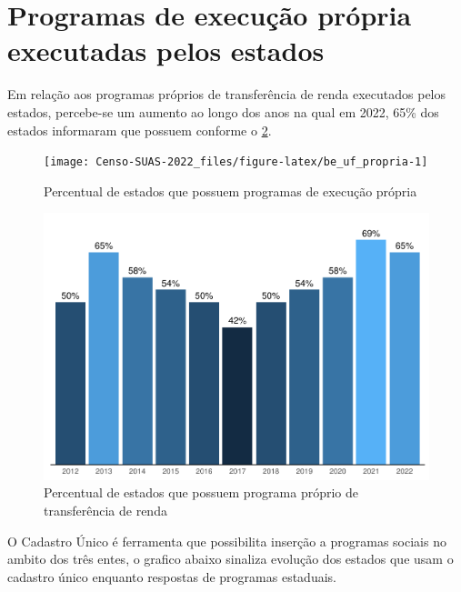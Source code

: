 \documentclass[
  brazilian]{report}
\begin{document}
\hypertarget{programas-de-execuuxe7uxe3o-pruxf3pria-executadas-pelos-estados}{%
\section{Programas de execução própria executadas pelos
estados}\label{programas-de-execuuxe7uxe3o-pruxf3pria-executadas-pelos-estados}}

Em relação aos programas próprios de transferência de renda executados
pelos estados, percebe-se um aumento ao longo dos anos na qual em 2022,
65\% dos estados informaram que possuem conforme o
\cref{fig:be_uf_renda}.

\begin{figure}
\texttt{[image: Censo-SUAS-2022\_files/figure-latex/be\_uf\_propria-1]} \caption[Percentual de estados que possuem programas de execução própria]{Percentual de estados que possuem programas de execução própria}\label{fig:be_uf_propria}
\end{figure}
\begin{figure}
\includegraphics{Censo-SUAS-2022_files/figure-latex/be_uf_renda-1} \caption[Percentual de estados que possuem programa próprio de transferência de renda]{Percentual de estados que possuem programa próprio de transferência de renda}\label{fig:be_uf_renda}
\end{figure}

O Cadastro Único é ferramenta que possibilita inserção a programas
sociais no ambito dos três entes, o grafico abaixo sinaliza evolução dos
estados que usam o cadastro único enquanto respostas de programas
estaduais.
\end{document}
